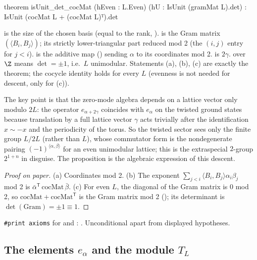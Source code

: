 \begin{leancode}
theorem isUnit_det_cocMat (hEven : L.Even) (hU : IsUnit (gramMat L).det) :
    IsUnit (cocMat L + (cocMat L)ᵀ).det
\end{leancode}
\begin{dictionary}
 is the size of the chosen basis (equal to the rank, ).
 is the Gram matrix $(\langle B_i,B_j\rangle)$;  its strictly
lower-triangular part reduced mod 2 (the $(i,j)$ entry for $j<i$).   is the additive
map () sending $\alpha$ to its coordinates mod 2.   is $2\gamma$.
 over $\Z$ means $\det=\pm1$, i.e.\ $L$ unimodular.  Statements (a),
(b), (c) are exactly the theorem; the cocycle identity holds for every $L$ (evenness is not
needed for descent, only for (c)).
\end{dictionary}

\begin{physics}
The key point is that the zero-mode algebra depends on a lattice vector only modulo $2L$: the operator $e_{\alpha+2\gamma}$ coincides with $e_\alpha$ on the twisted ground states because translation by a full lattice vector $\gamma$ acts trivially after the identification $x\sim-x$ and the periodicity of the torus. So the twisted sector sees only the finite group $L/2L$ (rather than $L$), whose commutator form is the nondegenerate pairing $(-1)^{\langle\alpha,\beta\rangle}$ for an even unimodular lattice; this is the extraspecial $2$-group $2^{1+n}$ in disguise. The proposition is the algebraic expression of this descent.
\end{physics}
\begin{proof}[Proof on paper]
(a) Coordinates mod 2.  (b) The exponent $\sum_{j<i}\langle B_i,B_j\rangle\alpha_i\beta_j$ mod 2 is
$\bar\alpha^{\mathsf T}\,\mathrm{cocMat}\,\bar\beta$.  (c) For even $L$, the diagonal of the Gram
matrix is $0$ mod 2, so $\mathrm{cocMat}+\mathrm{cocMat}^{\mathsf T}$ is the Gram matrix mod 2
(); its determinant is $\det(\mathrm{Gram})=\pm1\equiv1$.
\end{proof}
\begin{status}
\texttt{\#print axioms} for  and : .  Unconditional apart from displayed hypotheses.
\end{status}

\subsection{The elements \texorpdfstring{$e_\alpha$}{e alpha} and the module \texorpdfstring{$T_L$}{T L}}

